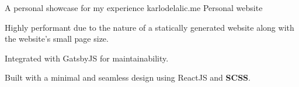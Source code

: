 \begin{cventries}

\cventry
{A personal showcase for my experience} %
{karlodelalic.me \href{https://github.com/kdelalic/karlodelalic.com-gatsby}{\faGithub}} %
{Personal website}
{}
{ %
\begin{cvitems}
\item {Highly performant due to the nature of a statically generated website along with the website's small page size.}
\item {Integrated with GatsbyJS for maintainability.}
\item {Built with a minimal and seamless design using ReactJS and \textbf{SCSS}.}
\end{cvitems}
}


\end{cventries}